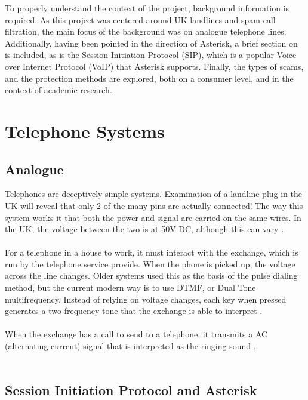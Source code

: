 \documentclass[main.tex]{subfiles}
\begin{document}
To properly understand the context of the project, background information is required. As this project was centered around UK landlines and spam call filtration, the main focus of the background was on analogue telephone lines. Additionally, having been pointed in the direction of Asterisk, a brief section on is included, as is the Session Initiation Protocol (SIP), which is a popular Voice over Internet Protocol (VoIP) that Asterisk supports. Finally, the types of scams, and the protection methods are explored, both on a consumer level, and in the context of academic research.

\section{Telephone Systems}
\subsection{Analogue}
Telephones are deceptively simple systems. Examination of a landline plug in the UK will reveal that only 2 of the many pins are actually connected! The way this system works it that both the power and signal are carried on the same wires. In the UK, the voltage between the two is at 50V DC, although this can vary \cite{telephone}.
\\\\
For a telephone in a house to work, it must interact with the exchange, which is run by the telephone service provide. When the phone is picked up, the voltage across the line changes. Older systems used this as the basis of the pulse dialing method, but the current modern way is to use DTMF, or Dual Tone multifrequency. Instead of relying on voltage changes, each key when pressed generates a two-frequency tone that the exchange is able to interpret \cite{telephone}.
\\\\
When the exchange has a call to send to a telephone, it transmits a AC (alternating current) signal that is interpreted as the ringing sound \cite{telephone}.
\\\\

\subsection{Session Initiation Protocol and Asterisk}
\end{document}
